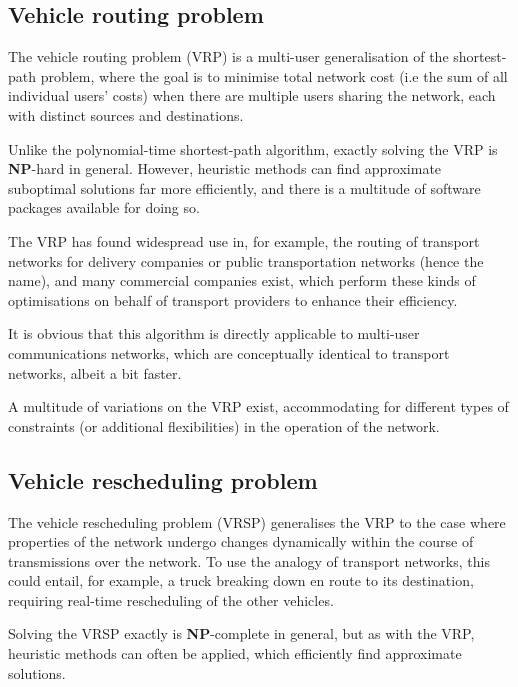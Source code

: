 \documentclass[aps,rmp,twocolumn,amsmath,amssymb,nofootinbib,superscriptaddress,longbibliography,floatfix,table-of-contents,eqsecnum]{revtex4-1}
\begin{document}
%
%

\subsection{Vehicle routing problem} \label{sec:VRP} 

The vehicle routing problem (VRP) is a multi-user generalisation of the shortest-path problem, where the goal is to minimise total network cost (i.e the sum of all individual users' costs) when there are multiple users sharing the network, each with distinct sources and destinations.

Unlike the polynomial-time shortest-path algorithm, exactly solving the VRP is \textbf{NP}-hard in general. However, heuristic methods can find approximate suboptimal solutions far more efficiently, and there is a multitude of software packages available for doing so.

The VRP has found widespread use in, for example, the routing of transport networks for delivery companies or public transportation networks (hence the name), and many commercial companies exist, which perform these kinds of optimisations on behalf of transport providers to enhance their efficiency.

It is obvious that this algorithm is directly applicable to multi-user communications networks, which are conceptually identical to transport networks, albeit a bit faster. 

A multitude of variations on the VRP exist, accommodating for different types of constraints (or additional flexibilities) in the operation of the network.

%
%

\subsection{Vehicle rescheduling problem} \label{sec:VRSP} 

The vehicle rescheduling problem (VRSP) generalises the VRP to the case where properties of the network undergo changes dynamically within the course of transmissions over the network. To use the analogy of transport networks, this could entail, for example, a truck breaking down en route to its destination, requiring real-time rescheduling of the other vehicles.

Solving the VRSP exactly is \textbf{NP}-complete in general, but as with the VRP, heuristic methods can often be applied, which efficiently find approximate solutions.
\end{document}
